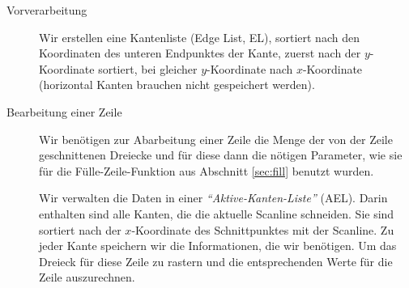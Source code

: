 \begin{description}
\item[Vorverarbeitung] Wir erstellen eine Kantenliste (Edge List, EL), sortiert nach den Koordinaten des unteren Endpunktes der Kante,
	zuerst nach der $y$-Koordinate sortiert, bei gleicher $y$-Koordinate nach $x$-Koordinate
	(horizontal Kanten brauchen nicht gespeichert werden).
\item[Bearbeitung einer Zeile] Wir benötigen zur Abarbeitung einer Zeile die Menge der von der Zeile
	geschnittenen Dreiecke und für diese dann die nötigen Parameter, wie sie für die Fülle-Zeile-Funktion aus
	Abschnitt \ref{sec:fill} benutzt wurden.

	Wir verwalten die Daten in einer \emph{"`Aktive-Kanten-Liste"'} (AEL). Darin enthalten sind alle Kanten, die
	die aktuelle Scanline schneiden. Sie sind sortiert nach der $x$-Koordinate des Schnittpunktes mit der Scanline.
	Zu jeder Kante speichern wir die Informationen, die wir benötigen. Um das Dreieck für diese Zeile zu rastern und
	die entsprechenden Werte für die Zeile auszurechnen.


\end{description}
